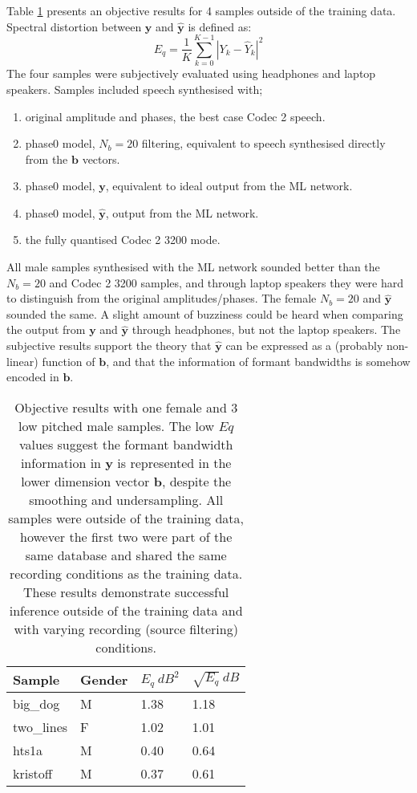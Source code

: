 \documentclass{article}
\begin{document}
Table \ref{tab:ml_sd} presents an objective results for 4 samples outside of the training data.  Spectral distortion between $\mathbf{y}$ and $\hat{\mathbf{y}}$ is defined as:
\begin{equation}
E_q = \frac{1}{K}\sum_{k=0}^{K-1} |Y_k - \hat{Y}_k |^2
\end{equation}
The four samples were subjectively evaluated using headphones and laptop speakers.  Samples included speech synthesised with;
\begin{enumerate}
\item original amplitude and phases, the best case Codec 2 speech.
\item phase0 model, $N_b=20$ filtering, equivalent to speech synthesised directly from the $\mathbf{b}$ vectors.
\item phase0 model, $\mathbf{y}$,  equivalent to ideal output from the ML network.
\item phase0 model, $\hat{\mathbf{y}}$, output from the ML network.
\item the fully quantised Codec 2 3200 mode.
\end{enumerate}
All male samples synthesised with the ML network sounded better than the $N_b=20$ and Codec 2 3200 samples, and through laptop speakers they were hard to distinguish from the original amplitudes/phases.  The female $N_b=20$ and  $\hat{\mathbf{y}}$ sounded the same.  A slight amount of buzziness could be heard when comparing the output from $\mathbf{y}$ and $\hat{\mathbf{y}}$ through headphones, but not the laptop speakers. The subjective results support the theory that $\hat{\mathbf{y}}$ can be expressed as a (probably non-linear) function of $\mathbf{b}$, and that the information of formant bandwidths is somehow encoded in $\mathbf{b}$.
\begin{table}[H]
\label{tab:ml_sd}
\centering
\begin{tabular}{l l l l}
\hline
Sample & Gender & $E_q \: dB^2$ & $\sqrt{E_q} \: dB$  \\
\hline
big\_dog & M & 1.38 & 1.18  \\
two\_lines & F & 1.02 & 1.01 \\
hts1a & M & 0.40 & 0.64 \\
kristoff & M & 0.37 & 0.61  \\
\hline
\end{tabular}
\caption{Objective results with one female and 3 low pitched male samples.  The low $Eq$ values suggest the formant bandwidth information in $\mathbf{y}$ is represented in the lower dimension vector $\mathbf{b}$, despite the smoothing and undersampling. All samples were outside of the training data, however the first two were part of the same database and shared the same recording conditions as the training data. These results demonstrate successful inference outside of the training data and with varying recording (source filtering) conditions.}
\end{table}
\end{document}

